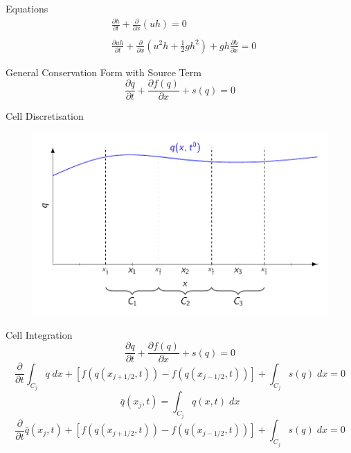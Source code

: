 \documentclass[pdf]{beamer}
\begin{document}
\begin{frame}{Equations}
	\begin{align}
	&\frac{\partial h}{\partial t} + \frac{\partial }{\partial x}\left( uh\right) = 0 \\ \nonumber \\
	&\frac{\partial u h}{\partial t} + \frac{\partial }{\partial x}\left( u^2h + \frac{1}{2}gh^2\right) + gh\frac{\partial b}{\partial x} = 0
	\end{align}
	
	General Conservation Form with Source Term
	\begin{equation}
	\frac{\partial q}{\partial t} + \frac{\partial f(q)}{\partial x} + s(q) = 0
	\end{equation}
\end{frame}
\begin{frame}{Cell Discretisation}
	\begin{figure}
		\includegraphics[width=\textwidth]{./Pics/FVMpicture/Cells.pdf}
	\end{figure}
\end{frame}
\begin{frame}{Cell Integration}
		\begin{equation*}
		\frac{\partial q}{\partial t} + \frac{\partial f(q)}{\partial x} + s(q) = 0
		\end{equation*}
		\begin{equation*}
		\frac{\partial}{\partial t} \int_{C_j} q \; dx + \left[f(q(x_{j+1/2},t)) - f(q(x_{j-1/2},t))  \right] + \int_{C_j} s(q) \; dx  = 0
		\end{equation*}
		\begin{equation*}
		\bar{q}(x_j,t)= \int_{C_j} q(x,t) \; dx
		\end{equation*}
		\begin{equation*}
		\frac{\partial}{\partial t} \bar{q}(x_j,t) + \left[f(q(x_{j+1/2},t)) - f(q(x_{j-1/2},t))  \right] + \int_{C_j} s(q) \; dx  = 0
		\end{equation*}
\end{frame}
\end{document}
